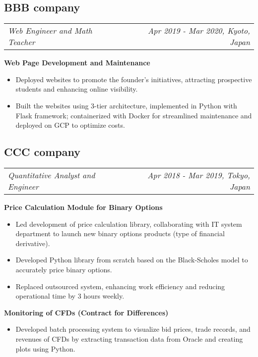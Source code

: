 \documentclass[11pt,a4paper]{moderncv}
\newcommand*{\experienceentry}[5][1.5mm]{
    \subsection{#2} \vspace{-1.5mm}
    \begin{tabularx}{\textwidth}{LR}
        {\itshape #3} & {\itshape #4, #5}
    \end{tabularx}
    \par\addvspace{#1}
}
\begin{document}
\begin{minipage}[t]{0.62\textwidth}
\experienceentry{BBB company}{Web Engineer and Math Teacher}{Apr 2019 - Mar 2020}{Kyoto, Japan}

\textbf{Web Page Development and Maintenance}
\begin{itemize}
    \item Deployed websites to promote the founder's initiatives, attracting prospective students and enhancing online visibility.
    \item Built the websites using 3-tier architecture, implemented in Python with Flask framework; containerized with Docker for streamlined maintenance and deployed on GCP to optimize costs.
\end{itemize}
\vspace{2.0mm}

\experienceentry{CCC company}{Quantitative Analyst and Engineer}{Apr 2018 - Mar 2019}{Tokyo, Japan}

\textbf{Price Calculation Module for Binary Options}
\begin{itemize}
    \item Led development of price calculation library, collaborating with IT system department to launch new binary options products (type of financial derivative).
    \item Developed Python library from scratch based on the Black-Scholes model to accurately price binary options.
    \item Replaced outsourced system, enhancing work efficiency and reducing operational time by 3 hours weekly.
\end{itemize}
\vspace{1.0mm}

\textbf{Monitoring of CFDs (Contract for Differences)}
\begin{itemize}
    \item Developed batch processing system to visualize bid prices, trade records, and revenues of CFDs by extracting transaction data from Oracle and creating plots using Python.
\end{itemize}

\end{minipage}
\hfill
\end{document}
